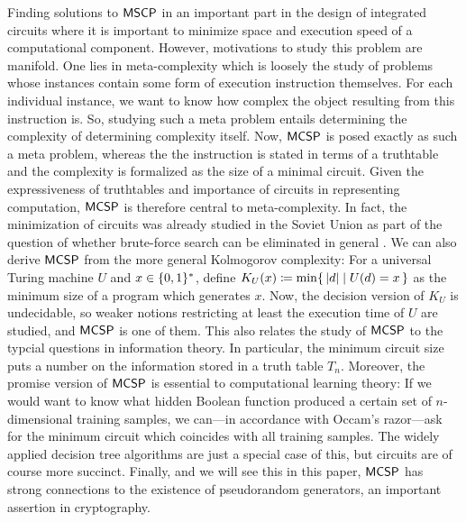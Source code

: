 \documentclass[11pt]{article}
\begin{document}
Finding solutions to $\mathsf{MSCP}$ in an important part in the design
of integrated circuits where it is important to minimize space and execution
speed of a computational component.
However, motivations to study this problem are manifold.
%
One lies in meta-complexity which is loosely the study of problems whose
instances contain some form of execution instruction themselves.
For each individual instance, we want to know how complex the object resulting
from this instruction is.
So, studying such a meta problem entails determining the complexity of
determining complexity itself.
Now, $\mathsf{MCSP}$ is posed exactly as such a meta problem, whereas the
the instruction is stated in terms of a truthtable and the complexity is
formalized as the size of a minimal circuit.
Given the expressiveness of truthtables and importance of circuits in
representing computation, $\mathsf{MCSP}$ is therefore central to
meta-complexity.
%
In fact, the minimization of circuits was already studied in the Soviet Union
as part of the question of whether brute-force search can be eliminated
in general \cite{trakhtenbrot84}.
%
We can also derive $\mathsf{MCSP}$ from the more general Kolmogorov complexity:
For a universal Turing machine $U$ and $x \in \{0,1\}^*$, define
$K_U(x) \coloneqq \min \{\, { |d| \mid U(d) = x } \,\}$
as the minimum size of a program which generates $x$.
Now, the decision version of $K_U$ is undecidable, so weaker notions
restricting at least the execution time of $U$ are studied, and
$\mathsf{MCSP}$ is one of them.
%
This also relates the study of $\mathsf{MCSP}$ to the typcial questions in
information theory. In particular, the minimum circuit size puts a number on
the information stored in a truth table $T_n$.
%
Moreover, the promise version of $\mathsf{MCSP}$ is essential to computational
learning theory:
If we would want to know what hidden Boolean function produced a certain set of
$n$-dimensional training samples, we can---in accordance with Occam's
razor---ask for the minimum circuit which coincides with all training samples.
The widely applied decision tree algorithms are just a special case of this,
but circuits are of course more succinct.
%
Finally, and we will see this in this paper,
$\mathsf{MCSP}$ has strong connections to the existence of
pseudorandom generators, an important assertion in cryptography.
\end{document}
